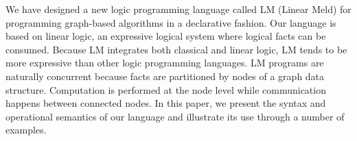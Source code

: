 We have designed a new logic programming language called LM (Linear Meld)
for programming graph-based algorithms in a declarative fashion. Our language
is based on linear logic, an expressive logical system where logical facts can
be consumed. Because LM integrates both classical and linear logic, LM tends
to be more expressive than other logic programming languages.
LM programs are naturally concurrent because facts are partitioned by nodes
of a graph data structure.
Computation is performed at the node level while communication happens
between connected nodes.
In this paper, we present the syntax and operational semantics of our language
and illustrate its use through a number of examples.